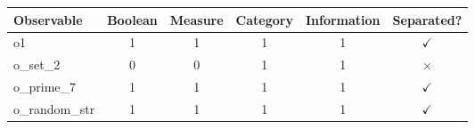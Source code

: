 \begin{tabular}{l c c c c c}
\toprule
\textbf{Observable} & \textbf{Boolean} & \textbf{Measure} & \textbf{Category} & \textbf{Information} & \textbf{Separated?} \\\midrule
  o1 & 1 & 1 & 1 & 1 & $\checkmark$ \\
  o_set_2 & 0 & 0 & 1 & 1 & $\times$ \\
  o_prime_7 & 1 & 1 & 1 & 1 & $\checkmark$ \\
  o_random_str & 1 & 1 & 1 & 1 & $\checkmark$ \\
\bottomrule
\end{tabular}